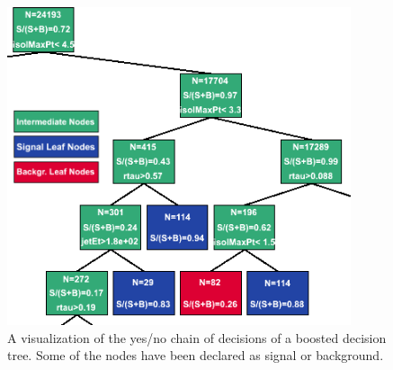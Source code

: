 \documentclass[a4paper]{jpconf}
\begin{document}
\begin{figure}[h]
\begin{minipage}{9.0cm}
\includegraphics[width=0.9\textwidth]{images/bdt.png}
\end{minipage}
\begin{minipage}{6.0cm}
\caption{A visualization of the yes/no chain of decisions of a boosted
 decision tree. Some of the nodes have been declared as signal or
 background.}
 \label{fig:bdt}
\end{minipage}
\end{figure}


\end{document}
